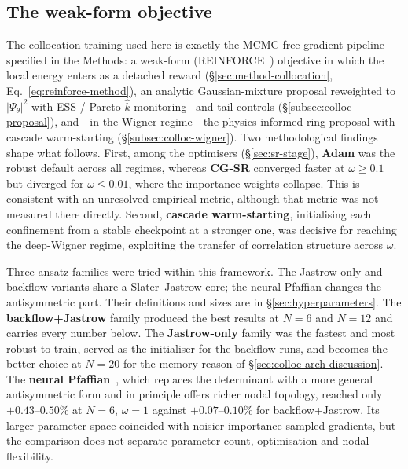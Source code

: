 \subsection{The weak-form objective}
\label{sec:colloc-method}
The collocation training used here is exactly the MCMC-free gradient pipeline specified in the
Methods: a weak-form (REINFORCE~\cite{Williams1992-REINFORCE}) objective in which the local energy
enters as a detached reward (\S\ref{sec:method-collocation},
Eq.~\eqref{eq:reinforce-method}), an analytic Gaussian-mixture proposal reweighted to
$|\Psi_\theta|^2$ with ESS / Pareto-$\hat k$ monitoring~\cite{Vehtari2024} and tail
controls (\S\ref{subsec:colloc-proposal}), and---in the Wigner
regime---the physics-informed ring proposal with cascade warm-starting
(\S\ref{subsec:colloc-wigner}). Two methodological findings shape what follows. First, among
the optimisers (\S\ref{sec:sr-stage}), \textbf{Adam} was the robust
default across all regimes, whereas \textbf{CG-SR} converged faster at $\omega\!\ge\!0.1$ but
diverged for $\omega\!\le\!0.01$, where the importance weights collapse. This is consistent
with an unresolved empirical metric, although that metric was not measured there directly.
Second, \textbf{cascade warm-starting}, initialising each confinement from a stable checkpoint at a stronger one, was decisive for reaching the deep-Wigner regime, exploiting
the transfer of correlation structure across $\omega$.


\label{sec:colloc-architectures}
Three ansatz families were tried within this framework. The Jastrow-only and backflow
variants share a Slater--Jastrow core; the neural Pfaffian changes the antisymmetric part.
Their definitions and sizes are in \S\ref{sec:hyperparameters}. The
\textbf{backflow+Jastrow} family produced the best
results at $N{=}6$ and $N{=}12$ and carries every number below. The
\textbf{Jastrow-only} family was the fastest and most robust to train, served as the
initialiser for the backflow runs, and becomes the better choice at $N{=}20$ for the memory
reason of \S\ref{sec:colloc-arch-discussion}. The \textbf{neural
Pfaffian}~\cite{GaoGuennemann2024-NeuralPfaffian}, which replaces the determinant with a
more general antisymmetric form and in principle offers richer nodal topology, reached only
$+0.43$--$0.50\%$ at $N{=}6$, $\omega{=}1$ against $+0.07$--$0.10\%$ for backflow+Jastrow.
Its larger parameter space coincided with noisier importance-sampled gradients, but the
comparison does not separate parameter count, optimisation and nodal flexibility.

